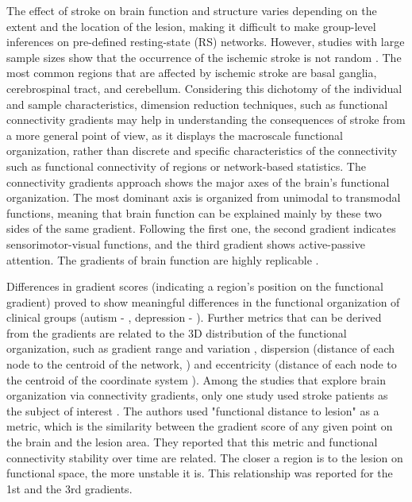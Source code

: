 \documentclass[fleqn,10pt]{wlscirep}
\begin{document}
The effect of stroke on brain function and structure varies depending on the extent and the location of the lesion, making it difficult to make group-level inferences on pre-defined resting-state (RS) networks. \color{green}However, studies with large sample sizes show that the occurrence of the ischemic stroke is not random \citep{weaver2019meta, thiebaut2020brain}. The most common regions that are affected by ischemic stroke are basal ganglia, cerebrospinal tract, and cerebellum. \color{black}Considering this dichotomy of the individual and sample characteristics, dimension reduction techniques, such as functional connectivity gradients \citep{margulies2016situating, vos2020brainspace} may help in understanding the consequences of stroke from a more general point of view, as it displays the macroscale functional organization, rather than discrete and specific characteristics of the connectivity such as functional connectivity of regions or network-based statistics. The connectivity gradients approach shows the major axes of the brain's functional organization. The most dominant axis is organized from unimodal to transmodal functions, meaning that brain function can be explained mainly by these two sides of the same gradient. Following the first one, the second gradient indicates sensorimotor-visual functions, and the third gradient shows active-passive attention. The gradients of brain function are highly replicable \citep{margulies2016situating, hardikar2022macro, mckeown2020relationship, hong2019atypical, bethlehem2020dispersion} .

Differences in gradient scores (indicating a region's position on the functional gradient) proved to show meaningful differences in the functional organization of clinical groups (autism - \cite{hong2019atypical}, depression - \cite{xia2022connectome}). Further metrics that can be derived from the gradients are related to the 3D distribution of the functional organization, such as gradient range and variation \citep{del2022higher}, dispersion (distance of each node to the centroid of the network, \cite{valk2023functional}) and eccentricity (distance of each node to the centroid of the coordinate system \cite{valk2023functional}). Among the studies that explore brain organization via connectivity gradients, only one study used stroke patients as the subject of interest \citep{bayrak2019impact}. The authors used "functional distance to lesion" as a metric, which is the similarity between the gradient score of any given point on the brain and the lesion area. They reported that this metric and functional connectivity stability over time are related. The closer a region is to the lesion on functional space, the more unstable it is. This relationship was reported for the 1st and the 3rd gradients.  
\end{document}
